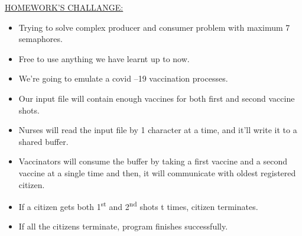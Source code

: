 \documentclass[12pt]{report}
\renewcommand{\_}{\kern-1.5pt\textunderscore\kern-1.5pt}
\begin{document}
\vspace{\baselineskip}
\begin{justify}
{\fontsize{16pt}{19.2pt}\selectfont \uline{HOMEWORK’S CHALLANGE:}}
\end{justify}
\begin{itemize}
	\item Trying to solve complex producer and consumer problem with maximum 7 semaphores.
	\item Free to use anything we have learnt up to now.
	\item We’re going to emulate a covid –19 vaccination processes.
	\item Our input file will contain enough vaccines for both first and second vaccine shots.
	\item Nurses will read the input file by 1 character at a time, and it’ll write it to a shared buffer.
	\item Vaccinators will consume the buffer by taking a first vaccine and a second vaccine at a single time and then, it will communicate with oldest registered citizen.
	\item If a citizen gets both 1\textsuperscript{st} and 2\textsuperscript{nd} shots t times, citizen terminates.
	\item If all the citizens terminate, program finishes successfully.
\end{itemize}

\vspace{\baselineskip}
\end{document}
